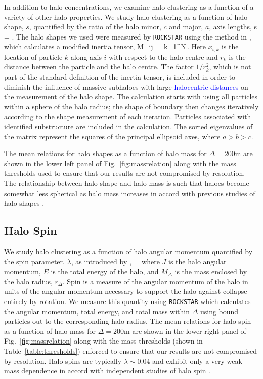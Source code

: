 \documentclass[usenatbib,fleqn]{mnras}
\begin{document}
In addition to halo concentrations, we examine halo clustering as a function of a variety of other halo properties. We study halo clustering as a function of halo shape, $s$, quantified by the ratio of the halo minor, $c$ and major, $a$, axis lengths, 
%
\beq
s = .
\eeq
%
The halo shapes we used were measured by {\tt ROCKSTAR} using the method in \cite{allgood_etal06}, which calculates a modified inertia tensor,
\beq
M_{ij}=\sum\limits_{k=1}^{N}\,.
\eeq
Here $x_{i,k}$ is the location of particle $k$ along axis $i$ with respect to the halo centre and $r_{k}$ is the distance between the particle and the halo centre. The factor $1/r_{k}^2$, which is not part of the standard definition of the inertia tensor, is included in order to diminish the influence of massive subhaloes with large \textcolor{blue}{halocentric distances} on the measurement of the halo shape. The calculation starts with using all particles within a sphere of the halo radius; the shape of boundary then changes iteratively according to the shape measurement of each iteration. Particles associated with identified substructure are included in the calculation. The sorted eigenvalues of the matrix represent the squares of the principal ellipsoid axes, where $a > b > c$. 

The mean relations for halo shapes as a function of halo mass for $\Delta=200$m are shown in the lower left panel of Fig.~\ref{fig:massrelation} along with the mass thresholds used to ensure that our results are not compromised by resolution. The relationship between halo shape and halo mass is such that haloes become somewhat less spherical as halo mass increases in accord with previous studies of halo shapes \citep[e.g.,][]{jing_suto02,allgood_etal06}.

\subsection{Halo Spin}

We study halo clustering as a function of halo angular momentum quantified by the spin parameter, $\lambda$, as introduced by \citep{peebles69},
\beq
\lambda = 
\eeq
where $J$ is the halo angular momentum, $E$ is the total energy of the halo, and $M_{\Delta}$ is the mass enclosed by the halo radius, $r_{\Delta}$. Spin is a measure of the angular momentum of the halo in units of the angular momentum necessary to support the halo against collapse entirely by rotation. We measure this quantity using {\tt ROCKSTAR} which calculates the angular momentum, total energy, and total mass within $\Delta$ using bound particles out to the corresponding halo radius. The mean relations for halo spin as a function of halo mass for $\Delta=200$m are shown in the lower right panel of Fig.~\ref{fig:massrelation} along with the mass thresholds (shown in Table~\ref{table:thresholds}) enforced to ensure that our results are not compromised by resolution. Halo spins are typically $\lambda \sim 0.04$ and exhibit only a very weak mass dependence in accord with independent studies of halo spin 
\citep[e.g.][]{bullock_etal02,maccio_etal07}.
\end{document}
